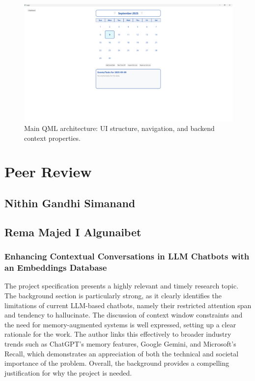 \documentclass{report}
\begin{document}
\begin{figure}
\centering
\includegraphics[width=\linewidth,height=\textheight,keepaspectratio]{png_files/Calendar.png}
\caption{Main QML architecture: UI structure, navigation, and backend context properties.}
\end{figure}

\chapter{Peer Review}
\section{Nithin Gandhi Simanand}
\section{Rema Majed I Algunaibet}
\subsection{Enhancing Contextual Conversations in LLM Chatbots with an Embeddings Database}
The project specification presents a highly relevant and timely research topic. The background section is particularly strong, as it clearly identifies the limitations of current LLM-based chatbots, namely their restricted attention span and tendency to hallucinate. The discussion of context window constraints and the need for memory-augmented systems is well expressed, setting up a clear rationale for the work. The author links this effectively to broader industry trends such as ChatGPT’s memory features, Google Gemini, and Microsoft’s Recall, which demonstrates an appreciation of both the technical and societal importance of the problem. Overall, the background provides a compelling justification for why the project is needed.
\end{document}
